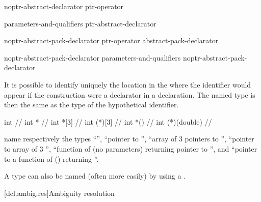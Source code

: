 \begin{bnf}
\br
    noptr-abstract-declarator\br
    ptr-operator 
\end{bnf}

\begin{bnf}
\br
     parameters-and-qualifiers\br
     \terminal{[}  \terminal{]} \br
    \terminal{(} ptr-abstract-declarator \terminal{)}
\end{bnf}

\begin{bnf}
\br
    noptr-abstract-pack-declarator\br
    ptr-operator abstract-pack-declarator
\end{bnf}

\begin{bnf}
\br
    noptr-abstract-pack-declarator parameters-and-qualifiers\br
    noptr-abstract-pack-declarator \terminal{[}  \terminal{]} \br
\end{bnf}

It is possible to identify uniquely the location in the
where the identifier would appear if the construction were a declarator
in a declaration.
The named type is then the same as the type of the
hypothetical identifier.
\begin{example}
\begin{codeblock}
int                 // 
int *               // 
int *[3]            // 
int (*)[3]          // 
int *()             // 
int (*)(double)     // 
\end{codeblock}
name respectively the types
``'',
``pointer to
'',
``array of 3 pointers to
'',
``pointer to array of 3
'',
``function of (no parameters) returning pointer to
'',
and ``pointer to a function of
()
returning
''.
\end{example}

\pnum
A type can also be named (often more easily) by using a
.

[dcl.ambig.res]{Ambiguity resolution}%
%

